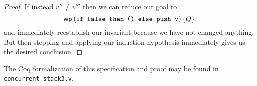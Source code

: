 \begin{proof}
  If instead $v'' \neq v'''$ then we can reduce our goal to
  \[
    \wpre{(\text{\tt if false then () else push v})}{Q}
  \]
  and immediately reestablish our invariant because we have not
  changed anything. But then stepping and applying our induction
  hypothesis immediately gives us the desired conclusion.
\end{proof}

The Coq formalization of this specification and proof may be found in
{\tt concurrent\_stack3.v}.

